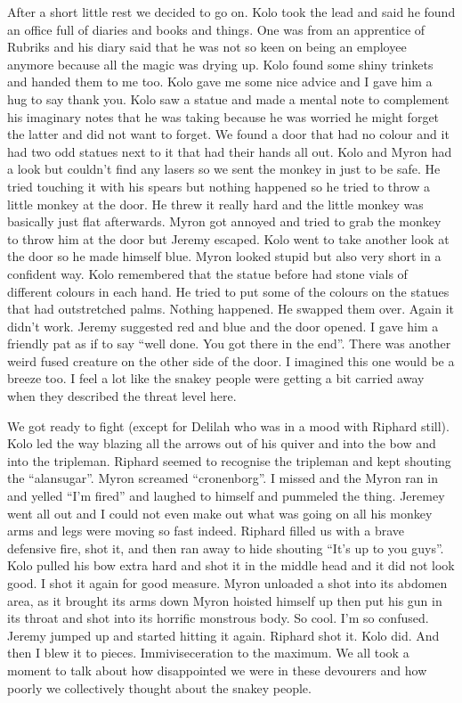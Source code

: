 \begin{multicols}{2}
After a short little rest we decided to go on. Kolo took the lead and said he found an office full of diaries and books and things. One was from an apprentice of Rubriks and his diary said that he was not so keen on being an employee anymore because all the magic was drying up. Kolo found some shiny trinkets and handed them to me too. Kolo gave me some nice advice and I gave him a hug to say thank you. Kolo saw a statue and made a mental note to complement his imaginary notes that he was taking because he was worried he might forget the latter and did not want to forget. We found a door that had no colour and it had two odd statues next to it that had their hands all out. Kolo and Myron had a look but couldn’t find any lasers so we sent the monkey in just to be safe. He tried touching it with his spears but nothing happened so he tried to throw a little monkey at the door. He threw it really hard and the little monkey was basically just flat afterwards. Myron got annoyed and tried to grab the monkey to throw him at the door but Jeremy escaped. Kolo went to take another look at the door so he made himself blue. Myron looked stupid but also very short in a confident way. Kolo remembered that the statue before had stone vials of different colours in each hand. He tried to put some of the colours on the statues that had outstretched palms. Nothing happened. He swapped them over. Again it didn’t work. Jeremy suggested red and blue and the door opened. I gave him a friendly pat as if to say “well done. You got there in the end”. There was another weird fused creature on the other side of the door. I imagined this one would be a breeze too. I feel a lot like the snakey people were getting a bit carried away when they described the threat level here.\medskip

We got ready to fight (except for Delilah who was in a mood with Riphard still). Kolo led the way blazing all the arrows out of his quiver and into the bow and into the tripleman. Riphard seemed to recognise the tripleman and kept shouting the “alansugar”. Myron screamed “cronenborg”. I missed and the Myron ran in and yelled “I’m fired” and laughed to himself and pummeled the thing. Jeremey went all out and I could not even make out what was going on all his monkey arms and legs were moving so fast indeed. Riphard filled us with a brave defensive fire, shot it, and then ran away to hide shouting “It’s up to you guys”. Kolo pulled his bow extra hard and shot it in the middle head and it did not look good. I shot it again for good measure. Myron unloaded a shot into its abdomen area, as it brought its arms down Myron hoisted himself up then put his gun in its throat and shot into its horrific monstrous body. So cool. I’m so confused. Jeremy jumped up and started hitting it again. Riphard shot it. Kolo did. And then I blew it to pieces. Immiviseceration to the maximum. We all took a moment to talk about how disappointed we were in these devourers and how poorly we collectively thought about the snakey people.\medskip


\end{multicols}
